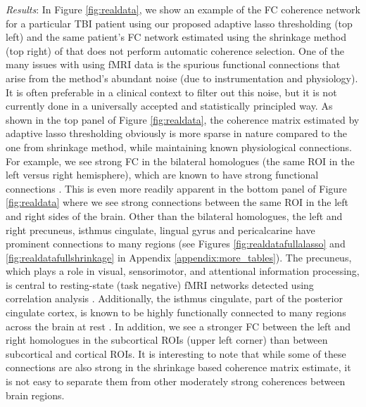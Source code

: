 \textit{Results}: In Figure \ref{fig:realdata}, we show an example of the FC coherence network for a particular TBI patient using our proposed adaptive lasso thresholding (top left) and the same patient's FC network estimated using the shrinkage method (top right) of \citep{bohm2009shrinkage} that does not perform automatic coherence selection. One of the many issues with using fMRI data is the spurious functional connections that arise from the method's abundant noise (due to instrumentation and physiology). It is often preferable in a clinical context to filter out this noise, but it is not currently done in a universally accepted and statistically principled way. As shown in the top panel of Figure \ref{fig:realdata}, the coherence matrix estimated by adaptive lasso thresholding obviously is more sparse in nature compared to the one from shrinkage method, while maintaining known physiological connections. For example, we see strong FC in the bilateral homologues (the same ROI in the left versus right hemisphere), which are known to have strong functional connections \citep{zuo2010growing}. This is even more readily apparent in the bottom panel of Figure \ref{fig:realdata} where we see strong connections between the same ROI in the left and right sides of the brain. Other than the bilateral homologues, the left and right precuneus, isthmus cingulate, lingual gyrus and pericalcarine have prominent connections to many regions (see Figures \ref{fig:realdatafullalasso} and \ref{fig:realdatafullshrinkage} in Appendix \ref{appendix:more_tables}). The precuneus, which plays a role in visual, sensorimotor, and attentional information processing, is central to resting-state (task negative) fMRI networks detected using correlation analysis \citep{Utevsky14}. Additionally, the isthmus cingulate, part of the posterior cingulate cortex, is known to be highly functionally connected to many regions across the brain at rest \citep{FRANSSON20081178}. In addition, we see a stronger FC between the left and right homologues in the subcortical ROIs (upper left corner) than between subcortical and cortical ROIs. It is interesting to note that while some of these connections are also strong in the shrinkage based coherence matrix estimate, it is not easy to separate them from other moderately strong coherences between brain regions.



